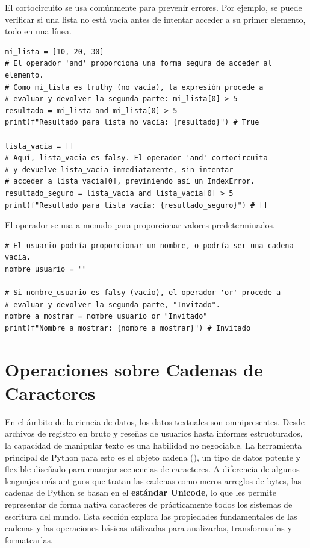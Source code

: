 \begin{example}
El cortocircuito se usa comúnmente para prevenir errores. Por ejemplo, se puede verificar si una lista no está vacía antes de intentar acceder a su primer elemento, todo en una línea.
\text{ }\begin{verbatim}
mi_lista = [10, 20, 30]
# El operador 'and' proporciona una forma segura de acceder al elemento.
# Como mi_lista es truthy (no vacía), la expresión procede a
# evaluar y devolver la segunda parte: mi_lista[0] > 5
resultado = mi_lista and mi_lista[0] > 5
print(f"Resultado para lista no vacía: {resultado}") # True

lista_vacia = []
# Aquí, lista_vacia es falsy. El operador 'and' cortocircuita
# y devuelve lista_vacia inmediatamente, sin intentar
# acceder a lista_vacia[0], previniendo así un IndexError.
resultado_seguro = lista_vacia and lista_vacia[0] > 5
print(f"Resultado para lista vacía: {resultado_seguro}") # []
\end{verbatim}

El operador  se usa a menudo para proporcionar valores predeterminados.
\text{ }\begin{verbatim}
# El usuario podría proporcionar un nombre, o podría ser una cadena vacía.
nombre_usuario = ""

# Si nombre_usuario es falsy (vacío), el operador 'or' procede a
# evaluar y devolver la segunda parte, "Invitado".
nombre_a_mostrar = nombre_usuario or "Invitado"
print(f"Nombre a mostrar: {nombre_a_mostrar}") # Invitado
\end{verbatim}
\end{example}

\section{Operaciones sobre Cadenas de Caracteres}
\label{sec:string_operations}
En el ámbito de la ciencia de datos, los datos textuales son omnipresentes. Desde archivos de registro en bruto y reseñas de usuarios hasta informes estructurados, la capacidad de manipular texto es una habilidad no negociable. La herramienta principal de Python para esto es el objeto cadena (), un tipo de datos potente y flexible diseñado para manejar secuencias de caracteres. A diferencia de algunos lenguajes más antiguos que tratan las cadenas como meros arreglos de bytes, las cadenas de Python se basan en el \textbf{estándar Unicode}, lo que les permite representar de forma nativa caracteres de prácticamente todos los sistemas de escritura del mundo. Esta sección explora las propiedades fundamentales de las cadenas y las operaciones básicas utilizadas para analizarlas, transformarlas y formatearlas.

